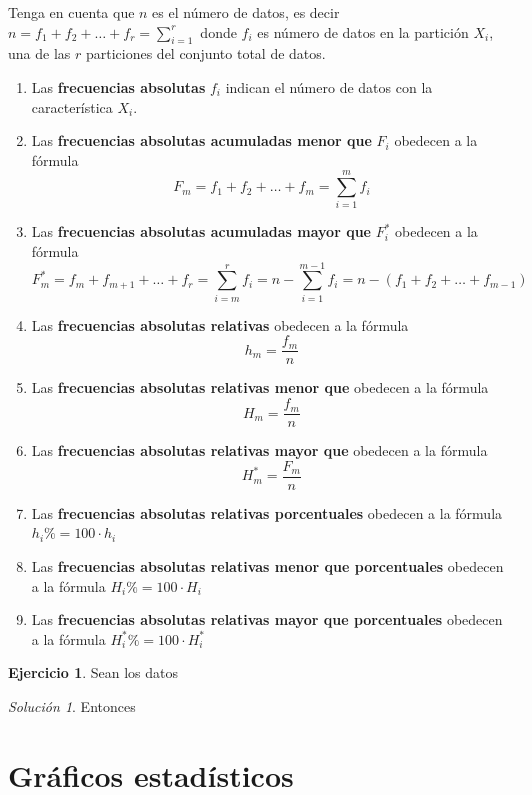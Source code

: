 \documentclass[10pt,]{krantz}
\theoremstyle{definition}
\theoremstyle{definition}
\theoremstyle{definition}
\newtheorem{exercise}{Ejercicio}[chapter]
\theoremstyle{definition}
\theoremstyle{remark}
\newtheorem*{solution}{Solución}
\begin{document}
Tenga en cuenta que \(n\) es el número de datos, es decir \(n=f_1+f_2+\ldots+f_r=\sum_{i=1}^r\) donde \(f_i\) es número de datos en la partición \(X_i\), una de las \(r\) particiones del conjunto total de datos.

\begin{enumerate}
\def\labelenumi{\arabic{enumi}.}
\item
  Las \textbf{frecuencias absolutas} \(f_i\) indican el número de datos con la característica \(X_i\).
\item
  Las \textbf{frecuencias absolutas acumuladas menor que} \(F_i\) obedecen a la fórmula
  \[F_m=f_1+f_2+\ldots+f_m=\sum_{i=1}^mf_i\]
\item
  Las \textbf{frecuencias absolutas acumuladas mayor que} \(F_i^*\) obedecen a la fórmula
  \[F_m^*=f_m+f_{m+1}+\ldots+f_r=\sum_{i=m}^rf_i=n-\sum_{i=1}^{m-1}f_i=n-\left(f_1+f_{2}+\ldots+f_{m-1}\right)\]
\item
  Las \textbf{frecuencias absolutas relativas} obedecen a la fórmula
  \[h_m=\frac{f_m}{n}\]
\item
  Las \textbf{frecuencias absolutas relativas menor que} obedecen a la fórmula
  \[H_m=\frac{f_m}{n}\]
\item
  Las \textbf{frecuencias absolutas relativas mayor que} obedecen a la fórmula
  \[H_m^*=\frac{F_m}{n}\]
\item
  Las \textbf{frecuencias absolutas relativas porcentuales} obedecen a la fórmula
  \(h_i\%=100\cdot h_i\)
\item
  Las \textbf{frecuencias absolutas relativas menor que porcentuales} obedecen a la fórmula
  \(H_i\%=100\cdot H_i\)
\item
  Las \textbf{frecuencias absolutas relativas mayor que porcentuales} obedecen a la fórmula
  \(H_i^*\%=100\cdot H_i^*\)
\end{enumerate}

\begin{exercise}
\protect\hypertarget{exr:unnamed-chunk-4}{}{\label{exr:unnamed-chunk-4} }Sean los datos
\end{exercise}

\begin{solution}
{}Entonces
\end{solution}

\hypertarget{gruxe1ficos-estaduxedsticos}{%
\chapter{Gráficos estadísticos}\label{gruxe1ficos-estaduxedsticos}}
\end{document}
